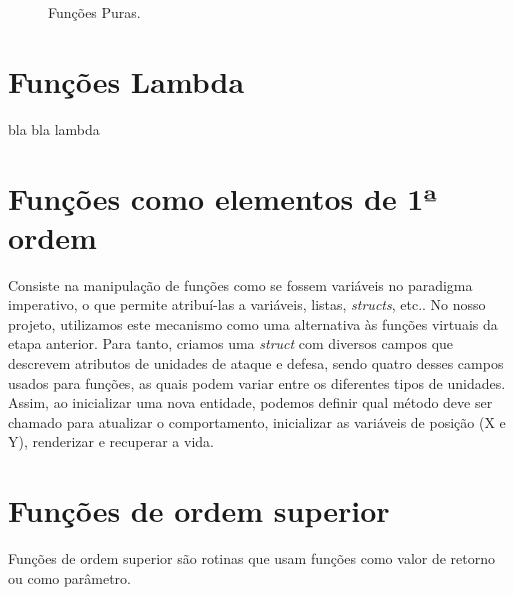 \documentclass[rel_mlp]{iiufrgs}
\newcommand{\fonte}[1]{\\Fonte: {#1}}
\begin{document}
	\begin{figure}[htb]
    \centering
    \label{fig:figura1}
    \caption{Funções Puras.}
\end{figure}

 \section{Funções Lambda}
bla bla lambda


 \section{Funções como elementos de 1ª ordem}

	Consiste na manipulação de funções como se fossem variáveis no paradigma imperativo, o que permite atribuí-las a variáveis, listas, \textit{structs}, etc.. No nosso projeto, utilizamos este mecanismo como uma alternativa às funções virtuais da etapa anterior. Para tanto, criamos uma \textit{struct} com diversos campos que descrevem atributos de unidades de ataque e defesa, sendo quatro desses campos usados para funções, as quais podem variar entre os diferentes tipos de unidades. Assim, ao inicializar uma nova entidade, podemos definir qual método deve ser chamado para atualizar o comportamento, inicializar as variáveis de posição (X e Y), renderizar e recuperar a vida.

 \section{Funções de ordem superior}

	Funções de ordem superior são rotinas que usam funções como valor de retorno ou como parâmetro.
\end{document}
